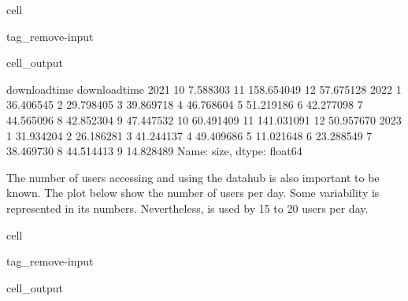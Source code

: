 \documentclass[letterpaper,10pt,english]{jupyterBook}
\begin{document}
\begin{sphinxuseclass}{cell}
\begin{sphinxuseclass}{tag_remove-input}\begin{sphinxVerbatimOutput}

\begin{sphinxuseclass}{cell_output}
\begin{sphinxVerbatim}[commandchars=\\\{\}]
download\PYGZus{}time  download\PYGZus{}time
2021           10                 7.588303
               11               158.654049
               12                57.675128
2022           1                 36.406545
               2                 29.798405
               3                 39.869718
               4                 46.768604
               5                 51.219186
               6                 42.277098
               7                 44.565096
               8                 42.852304
               9                 47.447532
               10                60.491409
               11               141.031091
               12                50.957670
2023           1                 31.934204
               2                 26.186281
               3                 41.244137
               4                 49.409686
               5                 11.021648
               6                 23.288549
               7                 38.469730
               8                 44.514413
               9                 14.828489
Name: size, dtype: float64
\end{sphinxVerbatim}

\end{sphinxuseclass}\end{sphinxVerbatimOutput}

\end{sphinxuseclass}
\end{sphinxuseclass}
\sphinxAtStartPar
The number of users accessing and using the datahub is also important to be known. The plot below show the number of users per day. Some variability is represented in its numbers. Nevertheless,  is used by 15 to 20 users per day.

\begin{sphinxuseclass}{cell}
\begin{sphinxuseclass}{tag_remove-input}\begin{sphinxVerbatimOutput}

\begin{sphinxuseclass}{cell_output}
\noindent{}

\end{sphinxuseclass}\end{sphinxVerbatimOutput}

\end{sphinxuseclass}
\end{sphinxuseclass}
\end{document}
